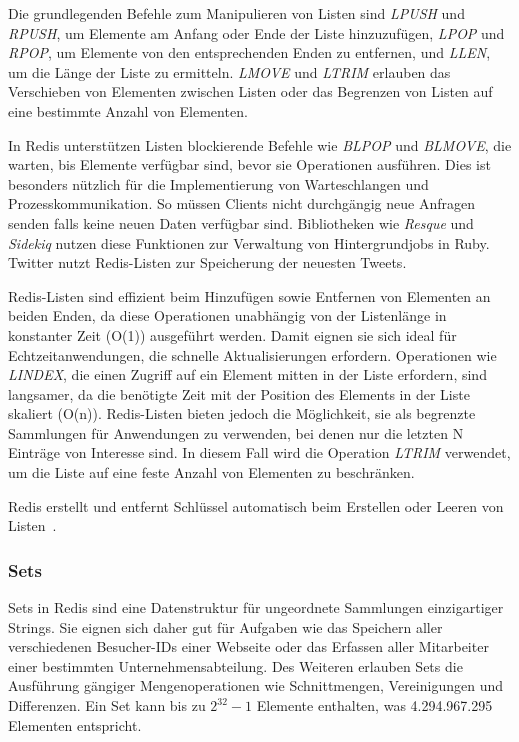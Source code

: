 Die grundlegenden Befehle zum Manipulieren von Listen sind \emph{LPUSH} und \emph{RPUSH}, um Elemente am Anfang oder Ende der Liste hinzuzufügen, \emph{LPOP} und \emph{RPOP}, um Elemente von den entsprechenden Enden zu entfernen, und \emph{LLEN}, um die Länge der Liste zu ermitteln.
\emph{LMOVE} und \emph{LTRIM} erlauben das Verschieben von Elementen zwischen Listen oder das Begrenzen von Listen auf eine bestimmte Anzahl von Elementen.

In Redis unterstützen Listen blockierende Befehle wie \emph{BLPOP} und \emph{BLMOVE}, die warten, bis Elemente verfügbar sind, bevor sie Operationen ausführen.
Dies ist besonders nützlich für die Implementierung von Warteschlangen und Prozesskommunikation. So müssen Clients nicht durchgängig neue Anfragen senden falls keine neuen Daten verfügbar sind.
Bibliotheken wie \emph{Resque} und \emph{Sidekiq} nutzen diese Funktionen zur Verwaltung von Hintergrundjobs in Ruby.
Twitter nutzt Redis-Listen zur Speicherung der neuesten Tweets.

Redis-Listen sind effizient beim Hinzufügen sowie Entfernen von Elementen an beiden Enden, da diese Operationen unabhängig von der Listenlänge in konstanter Zeit (O(1)) ausgeführt werden.
Damit eignen sie sich ideal für Echtzeitanwendungen, die schnelle Aktualisierungen erfordern. 
Operationen wie \emph{LINDEX}, die einen Zugriff auf ein Element mitten in der Liste erfordern, sind langsamer, da die benötigte Zeit mit der Position des Elements in der Liste skaliert (O(n)).
Redis-Listen bieten jedoch die Möglichkeit, sie als begrenzte Sammlungen für Anwendungen zu verwenden, bei denen nur die letzten N Einträge von Interesse sind.
In diesem Fall wird die Operation \emph{LTRIM} verwendet, um die Liste auf eine feste Anzahl von Elementen zu beschränken.


Redis erstellt und entfernt Schlüssel automatisch beim Erstellen oder Leeren von Listen~\cite{redis_ltd_lists_nodate}.


\subsubsection{Sets}
Sets in Redis sind eine Datenstruktur für ungeordnete Sammlungen einzigartiger Strings.
Sie eignen sich daher gut für Aufgaben wie das Speichern aller verschiedenen Besucher-IDs einer Webseite oder das Erfassen aller Mitarbeiter einer bestimmten Unternehmensabteilung.
Des Weiteren erlauben Sets die Ausführung gängiger Mengenoperationen wie Schnittmengen, Vereinigungen und Differenzen.
Ein Set kann bis zu \(2^{32} - 1\) Elemente enthalten, was 4.294.967.295 Elementen entspricht.

